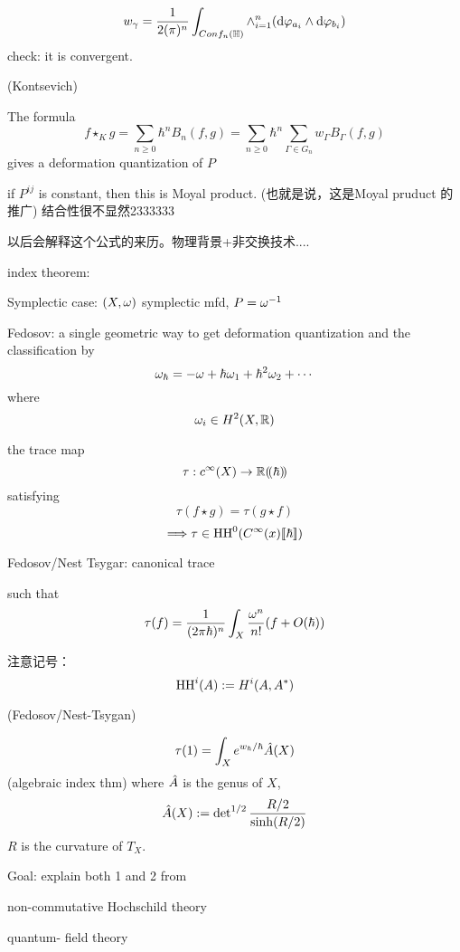 \begin{definition}
$$
  w_{\gamma}=\frac{1}{2(\pi)^n}
  \int_{Conf_n(\mathbb{H})}
    \wedge_{i=1}^n(\mathrm{d}\varphi_{a_i}\wedge\mathrm{d}\varphi_{b_i})
$$
check: it is convergent.
\end{definition}

\begin{thm}(Kontsevich)

The formula
$$f\star_{K}g=
\sum_{n\geq 0}\hbar^n
  B_n(f,g)=
\sum_{n\geq 0}\hbar^n
  \sum_{\Gamma\in G_n}w_{\Gamma}B_{\Gamma}(f,g)
  $$
gives a deformation quantization of $P$
\end{thm}

\begin{rem}
if $P^{ij}$ is constant, then this is Moyal product.
(也就是说，这是Moyal pruduct 的推广)
结合性很不显然2333333

以后会解释这个公式的来历。物理背景+非交换技术....
\end{rem}

index theorem:

Symplectic case: $(X,\omega)$ symplectic mfd,
$P=\omega^{-1}$

Fedosov: a single geometric way to get deformation quantization and the classification by
$$\omega_{\hbar}=-\omega+\hbar\omega_1+\hbar^2\omega_2+\cdots$$
where
$$\omega_i\in H^2(X,\mathbb{R})$$

\begin{definition}
 the trace map
$$\tau: c^{\infty}(X)\to \mathbb{R}(\!(\hbar)\!)$$
satisfying
$$\tau(f\star g)=\tau(g\star f)$$
$$\Longrightarrow \tau\in \operatorname{HH}^0(C^{\infty}(x)[\![\hbar]\!])$$

Fedosov/Nest Tsygar: canonical trace

such that
$$\tau(f)=\frac{1}{(2\pi\hbar)^n}
\int_X
  \frac{\omega^n}{n!}
  (f+O(\hbar))$$
\end{definition}

注意记号：
$$\operatorname{HH}^i(A):=H^i(A,A^*)$$


\begin{thm}(Fedosov/Nest-Tsygan)

$$\tau(1)=\int_X e^{w_{\hbar}/\hbar}\hat{A}(X)$$
(algebraic index thm)
where $\hat{A}$ is the genus of $X$,
$$\hat{A}(X):=
\det\nolimits^{1/2}\frac{R/2}{\sinh(R/2)}$$
$R$ is the curvature of $T_X$.
\end{thm}

Goal: explain both 1 and 2 from

non-commutative Hochschild theory

quantum- field theory


